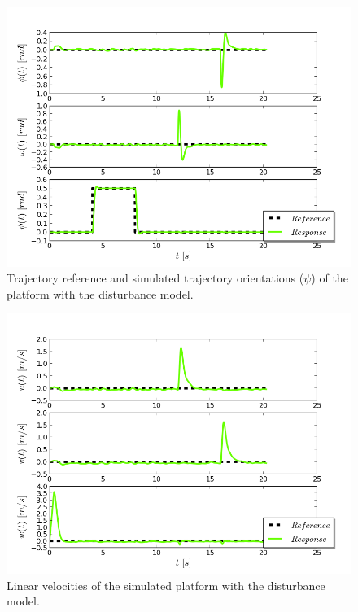 \begin{figure}[H]
\centering
\includegraphics[scale=0.7]{Images/Chapter5/ardrone/T1_noise/euler_angle_control.png}
\caption{Trajectory reference and simulated trajectory orientations ($\psi$) of the platform with the disturbance model.}
\label{fig:ardrone_ang2}
\end{figure}

\begin{figure}[H]    
\centering
\includegraphics[scale=0.7]{Images/Chapter5/ardrone/T1_noise/lin_velocity_control.png}
\caption{Linear velocities of the simulated platform with the disturbance model. }
\label{fig:ardrone_lin_vel2}
\end{figure}

